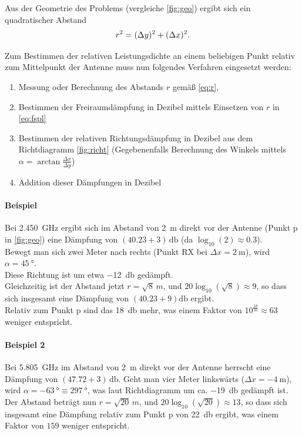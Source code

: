 \documentclass[a4paper,twoside]{scrreprt}
\newcommand{\lowf}{\SI{2.450}{\giga\hertz}}
\newcommand{\highf}{\SI{5.805}{\giga\hertz}}
\begin{document}
Aus der Geometrie des Problems (vergleiche \autoref{fig:geo}) ergibt sich ein
quadratischer Abstand
\begin{align}
  r^2=(\Delta y)^2+(\Delta x)^2\text.\label{eq:r}
\end{align}

Zum Bestimmen der relativen Leistungsdichte an einem beliebigen Punkt relativ
zum Mittelpunkt der Antenne muss nun folgendes Verfahren eingesetzt werden:
\begin{enumerate}
\item Messung oder Berechnung des Abstands $r$ gemäß \autoref{eq:r},
\item Bestimmen der Freiraumdämpfung in Dezibel mittels Einsetzen von $r$ in
  \autoref{eq:fspl}
\item Bestimmen der relativen Richtungsdämpfung in Dezibel aus dem Richtdiagramm
  \autoref{fig:richt} (Gegebenenfalls Berechnung des Winkels mittels
  $\alpha=\arctan\frac{\Delta x}{\Delta y}$)
\item Addition dieser Dämpfungen in Dezibel
\end{enumerate}

\paragraph{Beispiel} Bei \lowf{} ergibt sich im Abstand von \SI{2}{\meter}
direkt vor der Antenne (Punkt \glqq p\grqq{} in \autoref{fig:geo}) eine Dämpfung
von $(\num{40.23}+3)\,\si{\decibel}$ (da $\log_{10}(2) \approx 0.3$).\\
Bewegt man sich zwei Meter nach rechts (Punkt \grqq RX\glqq{} bei $\Delta
x=\SI{2}{\meter}$), wird $\alpha=\SI{45}{\degree}$.\\
Diese Richtung ist um etwa \SI{-12}{\decibel} gedämpft.\\
Gleichzeitig ist der Abstand jetzt $r=\sqrt8\,\si{m}$, und
$20\log_{10}\left(\sqrt8\right)\approx 9$, so dass sich insgesamt eine Dämpfung
von $(\num{40.23}+9)\si{\decibel}$ ergibt.\\
Relativ zum Punkt \glqq p\grqq{} sind das \SI{18}{\decibel} mehr, was einem
Faktor von
$10^{\frac{18}{10}}\approx 63$ weniger entspricht.

\paragraph{Beispiel 2} Bei \highf{} im Abstand von \SI{2}{\meter} direkt vor der
Antenne herrscht eine Dämpfung von $(\num{47.72}+3)\,\si{\decibel}$. Geht man vier
Meter linkswärts ($\Delta x=-\SI{4}{\meter}$), wird
$\alpha=\SI{-63}{\degree}\equiv\SI{297}{\degree}$, was laut Richtdiagramm um ca.
\SI{-19}{\decibel} gedämpft ist. Der Abstand beträgt nun $r=\sqrt{20}\,\si{m}$, und
$20\log_{10}\left(\sqrt{20}\right)\approx 13$, so dass sich insgesamt eine
Dämpfung relativ zum Punkt \glqq p\grqq{} von \SI{22}{\decibel} ergibt, was
einem Faktor von $159$ weniger entspricht.
\end{document}
